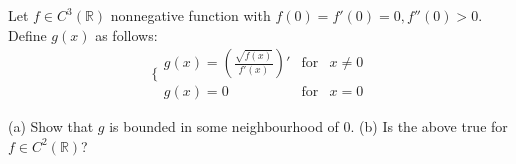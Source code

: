 Let $f\in C^3(\mathbb{R})$ nonnegative function with $f(0)=f'(0)=0, f''(0)>0$. Define $g(x)$ as follows:
\[ \{ \begin{array}{ccc}g(x)= (\frac{\sqrt{f(x)}}{f'(x)})' &\text{for}& x\not=0 \\ g(x)=0 &\text{for}& x=0\end{array}  \]

(a) Show that $g$ is bounded in some neighbourhood of $0$.
(b) Is the above true for $f\in C^2(\mathbb{R})$?